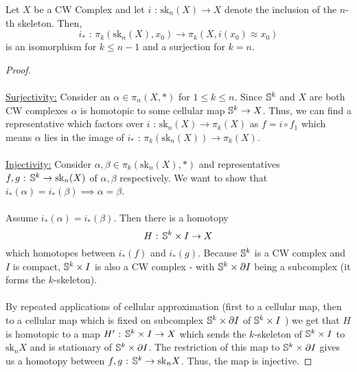 \documentclass[11pt]{article}
\begin{document}
\begin{dottedbox}
  \begin{redbox}
    \begin{lemma}
      Let $X$ be a CW Complex and let $i \text{ : } \mathrm{sk}_n(X) \rightarrow X$ denote the inclusion of the $n$-th skeleton. Then, $$ i_* \text{ : } \pi_k( \mathrm{sk}_n(X), x_0) \rightarrow \pi_k(X, i(x_0) \approx x_0)$$ is an isomorphism for $k \leq n-1$ and a surjection for $k = n$.
    \end{lemma}
  \end{redbox}
  \vskip 0.5cm

  \begin{proof}
    \\
    \\
    \underline{Surjectivity:} Consider an $\alpha \in \pi_n(X, *)$ for $1\leq k \leq n$. Since $\mathbb{S}^k$ and $X$ are both CW complexes $\alpha$ is homotopic to some cellular map $\mathbb{S}^k \rightarrow X$. Thus, we can find a representative which factors over $i \text{ : } \mathrm{sk}_n(X) \rightarrow \pi_k(X) $ as $f = i \circ f_1$ which means $\alpha$ lies in the image of $i_* \text{ : } \pi_k(\mathrm{sk}_n(X)) \rightarrow \pi_k(X)$. \\
    \\
    \underline{Injectivity:} Consider $\alpha, \beta \in \pi_k(\mathrm{sk}_n(X), *)$ and representatives $f, g \text{ : } \mathbb{S}^k \rightarrow \mathrm{sk}_n(X)$ of $\alpha, \beta$ respectively. We want to show that $i_*(\alpha) = i_*(\beta) \implies \alpha = \beta$.
    \\
    \\
    Assume $i_*(\alpha) = i_*(\beta)$. Then there is a homotopy $$ H \text{ : } \mathbb{S}^k \times I \rightarrow X $$ which homotopes between $i_*(f)$ and $i_*(g)$. Because $\mathbb{S}^k$ is a CW complex and $I$ is compact, $\mathbb{S}^k \times I$ is also a CW complex - with $\mathbb{S}^k \times \partial I$ being a subcomplex (it forms the $k$-skeleton). 
    \\
    \\
    By repeated applications of cellular approximation (first to a cellular map, then to a cellular map which is fixed on subcomplex $\mathbb{S}^k \times \partial I$  of $\mathbb{S}^k \times I$ ) we get that $H$ is homotopic to a map $H' \text{ : } \mathbb{S}^k \times I \rightarrow X$ which sends the $k$-skeleton of $\mathbb{S}^k \times I$ to $\mathrm{sk}_n X$ and is stationary of $\mathbb{S}^k \times \partial I$. The restriction of this map to $\mathbb{S}^k \times \partial I$ gives us a homotopy between $f, g \text{ : } \mathbb{S}^k \rightarrow \mathrm{sk}_n X$. Thus, the map is injective. 

\end{proof}
\end{dottedbox}
\end{document}
